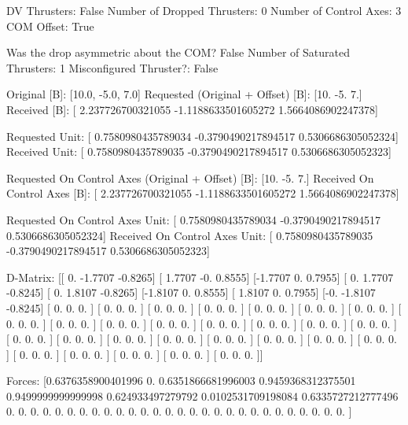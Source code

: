 DV Thrusters:	False
Number of Dropped Thrusters:	0
Number of Control Axes:	3
COM Offset:	True

Was the drop asymmetric about the COM?	False
Number of Saturated Thrusters:	1
Misconfigured Thruster?:	False

Original [B]:	[10.0, -5.0, 7.0]
Requested (Original + Offset) [B]:	[10. -5.  7.]
Received [B]:		[ 2.237726700321055  -1.1188633501605272  1.5664086902247378]

Requested Unit:		[ 0.7580980435789034 -0.3790490217894517  0.5306686305052324]
Received Unit:		[ 0.7580980435789035 -0.3790490217894517  0.5306686305052323]

Requested On Control Axes (Original + Offset) [B]:	[10. -5.  7.]
Received On Control Axes [B]:		[ 2.237726700321055  -1.1188633501605272  1.5664086902247378]

Requested On Control Axes Unit:		[ 0.7580980435789034 -0.3790490217894517  0.5306686305052324]
Received On Control Axes Unit:		[ 0.7580980435789035 -0.3790490217894517  0.5306686305052323]

D-Matrix:
[[ 0.     -1.7707 -0.8265]
 [ 1.7707 -0.      0.8555]
 [-1.7707  0.      0.7955]
 [ 0.      1.7707 -0.8245]
 [ 0.      1.8107 -0.8265]
 [-1.8107  0.      0.8555]
 [ 1.8107  0.      0.7955]
 [-0.     -1.8107 -0.8245]
 [ 0.      0.      0.    ]
 [ 0.      0.      0.    ]
 [ 0.      0.      0.    ]
 [ 0.      0.      0.    ]
 [ 0.      0.      0.    ]
 [ 0.      0.      0.    ]
 [ 0.      0.      0.    ]
 [ 0.      0.      0.    ]
 [ 0.      0.      0.    ]
 [ 0.      0.      0.    ]
 [ 0.      0.      0.    ]
 [ 0.      0.      0.    ]
 [ 0.      0.      0.    ]
 [ 0.      0.      0.    ]
 [ 0.      0.      0.    ]
 [ 0.      0.      0.    ]
 [ 0.      0.      0.    ]
 [ 0.      0.      0.    ]
 [ 0.      0.      0.    ]
 [ 0.      0.      0.    ]
 [ 0.      0.      0.    ]
 [ 0.      0.      0.    ]
 [ 0.      0.      0.    ]
 [ 0.      0.      0.    ]
 [ 0.      0.      0.    ]
 [ 0.      0.      0.    ]
 [ 0.      0.      0.    ]
 [ 0.      0.      0.    ]]

Forces:
[0.6376358900401996 0.                 0.6351866681996003
 0.9459368312375501 0.9499999999999998 0.624933497279792
 0.0102531709198084 0.6335727212777496 0.
 0.                 0.                 0.
 0.                 0.                 0.
 0.                 0.                 0.
 0.                 0.                 0.
 0.                 0.                 0.
 0.                 0.                 0.
 0.                 0.                 0.
 0.                 0.                 0.
 0.                 0.                 0.                ]

